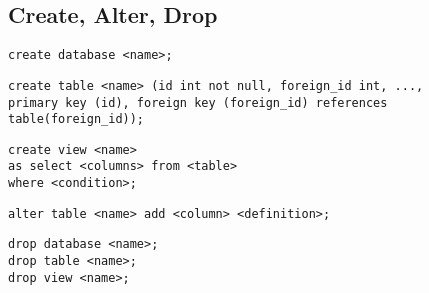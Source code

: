 \subsection{Create, Alter, Drop}

\begin{lstlisting}[caption=create database]
create database <name>;
\end{lstlisting}

\begin{lstlisting}[caption=create table]
create table <name> (id int not null, foreign_id int, ...,
primary key (id), foreign key (foreign_id) references table(foreign_id));
\end{lstlisting}

\begin{lstlisting}[caption=create view]
create view <name>
as select <columns> from <table>
where <condition>;
\end{lstlisting}

\begin{lstlisting}[caption=alter table]
alter table <name> add <column> <definition>;
\end{lstlisting}

\begin{lstlisting}[caption=drop]
drop database <name>;
drop table <name>;
drop view <name>;
\end{lstlisting}


